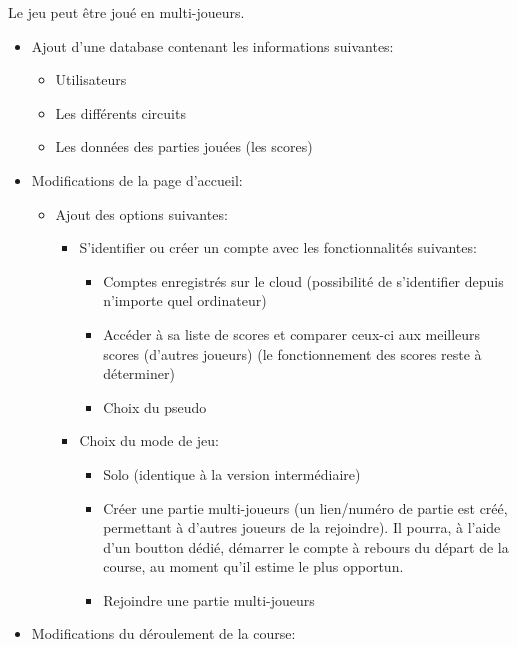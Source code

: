 \documentclass{article}
\begin{document}
Le jeu peut être joué en multi-joueurs.
\begin{itemize}
    \item Ajout d'une database contenant les informations suivantes: \begin{itemize}
              \item Utilisateurs
              \item Les différents circuits
              \item Les données des parties jouées (les scores)
          \end{itemize}
    \item Modifications de la page d'accueil: \begin{itemize}
              \item Ajout des options suivantes: \begin{itemize}
                        \item S'identifier ou créer un compte avec les fonctionnalités suivantes: \begin{itemize}
                                  \item Comptes enregistrés sur le cloud (possibilité de s'identifier depuis n'importe quel ordinateur)
                                  \item Accéder à sa liste de scores et comparer ceux-ci aux meilleurs scores (d'autres joueurs) (le fonctionnement des scores reste à déterminer)
                                  \item Choix du pseudo
                              \end{itemize}
                        \item Choix du mode de jeu: \begin{itemize}
                                  \item Solo (identique à la version intermédiaire)
                                  \item Créer une partie multi-joueurs (un lien/numéro de partie est créé, permettant à d'autres joueurs de la rejoindre). Il pourra, à l'aide d'un boutton dédié, démarrer le compte à rebours du départ de la course, au moment qu'il estime le plus opportun.
                                  \item Rejoindre une partie multi-joueurs
                              \end{itemize}
                    \end{itemize}
          \end{itemize}
    \item Modifications du déroulement de la course: \begin{itemize}

\end{itemize}
\end{itemize}
\end{document}
